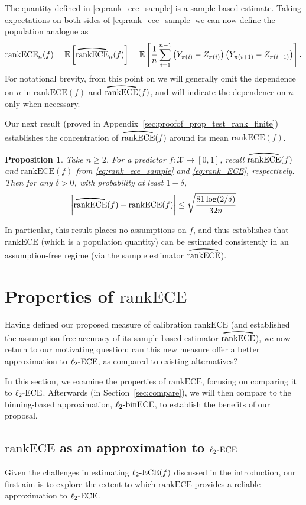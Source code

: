\documentclass[11pt]{article}
\numberwithin{equation}{section}
\newtheorem{proposition}{Proposition}[section]
\theoremstyle{definition}
\newcommand{\E}{\mathbb{E}}
\newcommand{\cX}{\mathcal{X}}
\newcommand{\ra}{\rightarrow}
\newcommand{\myoverline}[2][3.5em]{%
  \overset{%
    \tikz[baseline=-0.1ex]{
      \draw[line width=0.75pt]
        (0,0) .. controls (#1/2,0.5ex) .. (#1,0);
    }%
  }{#2}%
}
\newcommand{\ECE}{\mathrm{ECE}}
\newcommand{\lECE}{\ell_2\textnormal{-}\ECE}
\newcommand{\binECE}{\mathrm{binECE}}
\newcommand{\lbinECE}{\ell_2\textnormal{-}\binECE}
\newcommand{\rankECE}{\mathrm{rankECE}}
\newcommand{\hatrankECE}{\myoverline{\rankECE}}
\begin{document}
The quantity defined in \eqref{eq:rank_ece_sample} is a sample-based estimate. Taking expectations on both sides of \eqref{eq:rank_ece_sample} we can now define the population analogue as
\begin{align}\label{eq:rank_ECE}
\rankECE_n(f)=\E\left[\hatrankECE_n(f)\right]=\E\left[\frac{1}{n}\sum_{i=1}^{n-1}\left(Y_{\pi(i)} - Z_{\pi(i)}\right)\left(Y_{\pi(i+1)} - Z_{\pi(i+1)}\right)
\right].
\end{align}
For notational brevity, from this point on we will generally omit the dependence on $n$ in $\rankECE(f)$ and $\hatrankECE(f)$, and will indicate the dependence on $n$ only when necessary.

Our next result (proved in Appendix~\ref{sec:proofof_prop_test_rank_finite}) establishes the concentration of $\hatrankECE(f)$ around its mean $\rankECE(f)$.
\begin{proposition}\label{prop:test_rank_finite}
    Take $n\geq 2$. For a predictor $f:\cX\ra[0,1]$, recall $\hatrankECE(f)$ and $\rankECE(f)$ from \eqref{eq:rank_ece_sample} and \eqref{eq:rank_ECE}, respectively. Then for any $\delta>0$, with probability at least $1-\delta$,
    \begin{align*}
        \left|\hatrankECE(f) - \rankECE(f)\right|\leq \sqrt{\frac{81\log (2/\delta)}{32n}}
    \end{align*}
\end{proposition}
\noindent In particular, this result places no assumptions on $f$, and thus establishes that $\rankECE$ (which is a population quantity) can be estimated consistently in an assumption-free regime (via the sample estimator $\hatrankECE$).


\section{Properties of $\rankECE$}\label{sec:rank_prop}
Having defined our proposed measure of calibration $\rankECE$ (and established the assumption-free accuracy of its sample-based estimator $\hatrankECE$), we now return to our motivating question: can this new measure offer a better approximation to $\lECE$, as compared to existing alternatives?

In this section, we examine the properties of $\rankECE$, focusing on comparing it to $\lECE$. Afterwards (in Section~\ref{sec:compare}), we will then compare to the binning-based approximation, $\lbinECE$, to establish the benefits of our proposal.

\subsection{$\rankECE$ as an approximation to $\lECE$}
Given the challenges in estimating $\lECE(f)$ discussed in the introduction, our first aim is to explore the extent to which $\rankECE$ provides a reliable approximation to $\lECE$.
\end{document}
